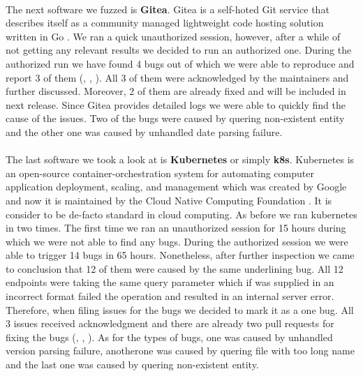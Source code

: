 \paragraph{}
The next software we fuzzed is \textbf{Gitea}. Gitea is a self-hoted Git service that describes itself as a community managed lightweight code hosting solution written in Go \cite{gitea2020web}. We ran a quick unauthorized session, however, after a while of not getting any relevant results we decided to run an authorized one. During the authorized run we have found 4 bugs out of which we were able to reproduce and report 3 of them (\cite{giteaissue15346github}, \cite{giteaissue15357github}, \cite{giteaissue15356github}). All 3 of them were acknowledged by the maintainers and further discussed. Moreover, 2 of them are already fixed and will be included in next release. Since Gitea provides detailed logs we were able to quickly find the cause of the issues. Two of the bugs were caused by quering non-existent entity and the other one was caused by unhandled date parsing failure.

\paragraph{}
The last software we took a look at is \textbf{Kubernetes} or simply \textbf{k8s}. Kubernetes is an open-source container-orchestration system for automating computer application deployment, scaling, and management which was created by Google and now it is maintained by the Cloud Native Computing Foundation \cite{k8s2021web}. It is consider to be de-facto standard in cloud computing. As before we ran kubernetes in two times. The first time we ran an unauthorized session for 15 hours during which we were not able to find any bugs. During the authorized session we were able to trigger 14 bugs in 65 hours. Nonetheless, after further inspection we came to conclusion that 12 of them were caused by the same underlining bug. All 12 endpoints were taking the same query parameter which if was supplied in an incorrect format failed the operation and resulted in an internal server error. Therefore, when filing issues for the bugs we decided to mark it as a one bug. All 3 issues received acknowledgment and there are already two pull requests for fixing the bugs (\cite{k8sissue101355github}, \cite{k8sissue101350github}, \cite{k8sissue101348github}). As for the types of bugs, one was caused by unhandled version parsing failure, anotherone was caused by quering file with too long name and the last one was caused by quering non-existent entity.

